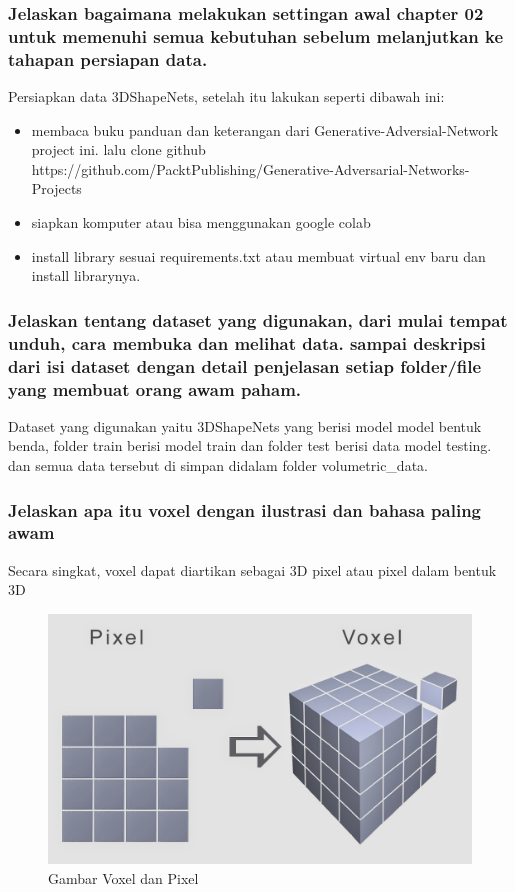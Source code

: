 \subsubsection{Jelaskan bagaimana melakukan settingan awal chapter 02 untuk memenuhi semua kebutuhan sebelum melanjutkan ke tahapan persiapan data.}
\hfill\break
Persiapkan data 3DShapeNets, setelah itu lakukan seperti dibawah ini:
\begin{itemize}
	\item membaca buku panduan dan keterangan dari Generative-Adversial-Network project ini. lalu clone github https://github.com/PacktPublishing/Generative-Adversarial-Networks-Projects
	\item siapkan komputer atau bisa menggunakan google colab
	\item install library sesuai requirements.txt atau membuat virtual env baru dan install librarynya.
\end{itemize}

\subsubsection{Jelaskan tentang dataset yang digunakan, dari mulai tempat unduh, cara membuka dan melihat data. sampai deskripsi dari isi dataset dengan detail penjelasan setiap folder/file yang membuat orang awam paham.}
\hfill\break
Dataset yang digunakan yaitu 3DShapeNets yang berisi model model bentuk benda, folder train berisi model train dan folder test berisi data model testing. dan semua data tersebut di simpan didalam folder volumetric\_data.

\subsubsection{Jelaskan apa itu voxel dengan ilustrasi dan bahasa paling awam}
\hfill\break
Secara singkat, voxel dapat diartikan sebagai 3D pixel atau pixel dalam bentuk 3D
\begin{figure}[H]
	\centering
	\includegraphics[width=12cm]{figures/1174066/8/no6.png}
	\caption{Gambar Voxel dan Pixel}
\end{figure}

